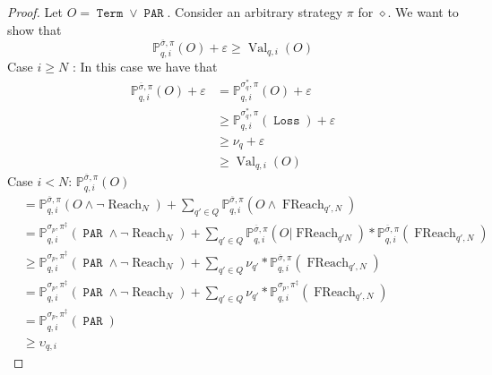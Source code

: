 \documentclass[10pt,a4paper]{amsart}
\DeclareMathOperator{\FReach}{FReach}
\DeclareMathOperator{\Loss}{\mathtt{Loss}}
\DeclareMathOperator{\Reach}{Reach}
\DeclareMathOperator{\Term}{\mathtt{Term}}
\newcommand{\eps}{\varepsilon}
\DeclareMathOperator{\parity}{\mathtt{PAR}}
\DeclareMathOperator{\val}{Val}
\begin{document}
  \begin{proof}
      Let $O = \Term \vee \parity$. Consider an arbitrary strategy $\pi$ for $\diamond$. We want to show that $$\mathbb{P}^{\overline{\sigma},\pi}_{q,i}(O) + \eps \geq \val_{q,i}(O)$$
      Case $i \geq N$ : In this case we have that
      \begin{align*}
          \mathbb{P}^{\overline{\sigma},\pi}_{q,i}(O) + \eps &= \mathbb{P}^{\sigma^*_q,\pi}_{q,i}(O) + \eps \\
          &\geq \mathbb{P}^{\sigma^*_q,\pi}_{q,i}(\Loss) + \eps \\
          &\geq \nu_q + \eps \\
          &\geq \val_{q,i}(O)
      \end{align*}
      Case $i < N$: $\mathbb{P}^{\overline{\sigma},\pi}_{q,i}(O)$
      \begin{align*}
           &= \mathbb{P}^{\overline{\sigma},\pi}_{q,i}\left(O \wedge \neg\Reach_N\right) + \sum_{q' \in Q} \mathbb{P}^{\overline{\sigma},\pi}_{q,i}\left(O \wedge \FReach_{q',N}\right)\\
           &= \mathbb{P}^{\sigma_p,\pi^{\ddagger}}_{q,i}(\parity \wedge \neg\Reach_N) + \sum_{q' \in Q} \mathbb{P}^{\overline{\sigma},\pi}_{q,i}\left(O | \FReach_{q'N} \right) * \mathbb{P}^{\overline{\sigma},\pi}_{q,i}(\FReach_{q',N}) \\
           &\geq  \mathbb{P}^{\sigma_p,\pi^{\ddagger}}_{q,i}(\parity \wedge \neg\Reach_N) + \sum_{q' \in Q} \nu_{q'} *  \mathbb{P}^{\overline{\sigma},\pi}_{q,i}(\FReach_{q',N}) \\
           &= \mathbb{P}^{\sigma_p,\pi^{\ddagger}}_{q,i}(\parity \wedge \neg\Reach_N) + \sum_{q' \in Q} \nu_{q'} * \mathbb{P}^{\sigma_p,\pi^{\ddagger}}_{q,i}(\FReach_{q',N}) \\
           &= \mathbb{P}^{\sigma_p,\pi^{\ddagger}}_{q,i}(\parity) \\
           &\geq \upsilon_{q,i}
      \end{align*}
  \end{proof}
\end{document}
